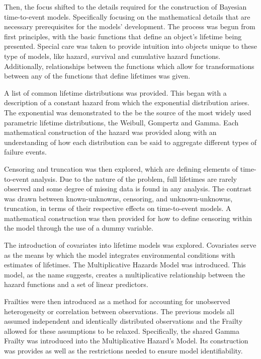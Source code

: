 Then, the focus shifted to the details required for the construction of Bayesian time-to-event models. Specifically focusing on the mathematical details that are necessary prerequisites for the models' development. The process was begun from first principles, with the basic functions that define an object's lifetime being presented. Special care was taken to provide intuition into objects unique to these type of models, like hazard, survival and cumulative hazard functions. Additionally, relationships between the functions which allow for transformations between any of the functions that define lifetimes was given.

A list of common lifetime distributions was provided. This began with a description of a constant hazard from which the exponential distribution arises. The exponential was demonstrated to the be the source of the most widely used parametric lifetime distributions, the Weibull, Gompertz and Gamma. Each mathematical construction of the hazard was provided along with an understanding of how each distribution can be said to aggregate different types of failure events. 

Censoring and truncation was then explored, which are defining elements of time-to-event analysis. Due to the nature of the problem, full lifetimes are rarely observed and some degree of missing data is found in any analysis. The contrast was drawn between known-unknowns, censoring, and unknown-unknowns, truncation, in terms of their respective effects on time-to-event models. A mathematical construction was then provided for how to define censoring within the model through the use of a dummy variable. 

The introduction of covariates into lifetime models was explored. Covariates serve as the means by which the model integrates environmental conditions with estimates of lifetimes. The Multiplicative Hazards Model was introduced. This model, as the name suggests, creates a multiplicative relationship between the hazard functions and a set of linear predictors. 

Frailties were then introduced as a method for accounting for unobserved heterogeneity or correlation between observations. The previous models all assumed independent and identically distributed observations and the Frailty allowed for these assumptions to be relaxed. Specifically, the shared Gamma Frailty was introduced into the Multiplicative Hazard's Model. Its construction was provides as well as the restrictions needed to ensure model identifiability. 

